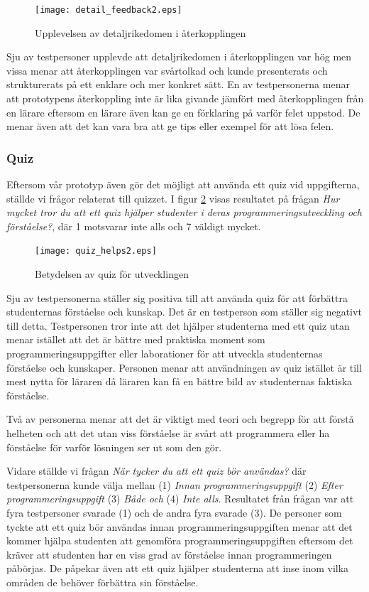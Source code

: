 \documentclass[a4paper,11pt]{article}
\begin{document}
{\begin{figure}[ht!]
\centering
\texttt{[image: detail\_feedback2.eps]}
\caption{Upplevelsen av detaljrikedomen i återkopplingen}
\label{fig:DetailFeedback}
\end{figure}

Sju av testpersoner upplevde att detaljrikedomen i återkopplingen var hög men vissa menar att återkopplingen var svårtolkad och kunde presenterats och strukturerats på ett enklare och mer konkret sätt. En av testpersonerna menar att prototypens återkoppling inte är lika givande jämfört med återkopplingen från en lärare eftersom en lärare även kan ge en förklaring på varför felet uppstod. De menar även att det kan vara bra att ge tips eller exempel för att lösa felen.

\newpage
\subsubsection{Quiz}

Eftersom vår prototyp även gör det möjligt att använda ett quiz vid uppgifterna, ställde vi frågor relaterat till quizzet. I figur \ref{fig:QuizHelps} visas resultatet på frågan \textit{Hur mycket tror du att ett quiz hjälper studenter i deras programmeringsutveckling och förståelse?}, där 1 motsvarar inte alls och 7 väldigt mycket.

\begin{figure}[ht!]
\centering
\texttt{[image: quiz\_helps2.eps]}
\caption{Betydelsen av quiz för utvecklingen}
\label{fig:QuizHelps}
\end{figure}

Sju av testpersonerna ställer sig positiva till att använda quiz för att förbättra studenternas förståelse och kunskap. Det är en testperson som ställer sig negativt till detta. Testpersonen tror inte att det hjälper studenterna med ett quiz utan menar istället att det är bättre med praktiska moment som programmeringsuppgifter eller laborationer för att utveckla studenternas förståelse och kunskaper. Personen menar att användningen av quiz istället är till mest nytta för läraren då läraren kan få en bättre bild av studenternas faktiska förståelse.

Två av personerna menar att det är viktigt med teori och begrepp för att förstå helheten och att det utan viss förståelse är svårt att programmera eller ha förståelse för varför lösningen ser ut som den gör.

Vidare ställde vi frågan \textit{När tycker du att ett quiz bör användas?} där testpersonerna kunde välja mellan (1) \textit{Innan programmeringsuppgift} (2) \textit{Efter programmeringsuppgift} (3) \textit{Både och} (4) \textit{Inte alls}. Resultatet från frågan var att fyra testpersoner svarade (1) och de andra fyra svarade (3). De personer som tyckte att ett quiz bör användas innan  programmeringsuppgiften menar att det kommer hjälpa studenten att genomföra programmeringsuppgiften eftersom det kräver att studenten har en viss grad av förståelse innan programmeringen påbörjas. De påpekar även att ett quiz hjälper studenterna att inse inom vilka områden de behöver förbättra sin förståelse. 

}
\end{document}
